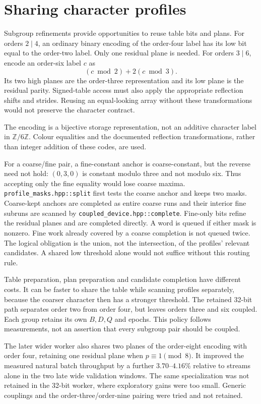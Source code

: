 \documentclass[11pt]{article}
\theoremstyle{definition}\newtheorem{remark}[theorem]{Remark}
\newcommand{\Z}{\mathbb Z}
\begin{document}
\section{Sharing character profiles}\label{sec:sharing}
Subgroup refinements provide opportunities to reuse table bits and plans.
For orders $2\mid4$, an ordinary binary encoding of the order-four label
has its low bit equal to the order-two label. Only one residual plane is
needed. For orders $3\mid6$, encode an order-six label $c$ as
\[
 (c\bmod2)+2(c\bmod3).
\]
Its two high planes are the order-three representation and its low plane
is the residual parity. Signed-table access must also apply the appropriate
reflection shifts and strides. Reusing an equal-looking array without
these transformations would not preserve the character contract.

The encoding is a bijective storage representation, not an additive
character label in $\Z/6\Z$. Colour equalities and the documented reflection
transformations, rather than integer addition of these codes, are used.

For a coarse/fine pair, a fine-constant anchor is coarse-constant, but the
reverse need not hold: $(0,3,0)$ is constant modulo three and not modulo
six. Thus accepting only the fine equality would lose coarse maxima.
\texttt{profile\_masks.hpp::split} first tests the coarse anchor and keeps
two masks. Coarse-kept anchors are completed as entire coarse runs and
their interior fine subruns are scanned by
\texttt{coupled\_device.hpp::complete}. Fine-only bits refine the residual
planes and are completed directly. A word is queued if either mask is
nonzero. Fine work already covered by a coarse completion is not queued
twice. The logical obligation is the union, not the intersection, of the
profiles' relevant candidates. A shared low threshold alone would not
suffice without this routing rule.

Table preparation, plan preparation and candidate completion have different
costs. It can be faster to share the table while scanning profiles
separately, because the coarser character then has a stronger threshold.
The retained 32-bit path separates order two from order four, but leaves
orders three and six coupled. Each group retains its own $B,D,Q$ and epochs.
This policy follows measurements, not an assertion that every subgroup
pair should be coupled.

The later wider worker also shares two planes of the order-eight encoding
with order four, retaining one residual plane when $p\equiv1\pmod8$.
It improved the measured natural batch throughput by a further
$3.70$--$4.16\%$ relative to streams alone in the two late wide validation
windows. The same specialization was not retained in the 32-bit worker,
where exploratory gains were too small. Generic couplings and the
order-three/order-nine pairing were tried and not retained.
\end{document}
